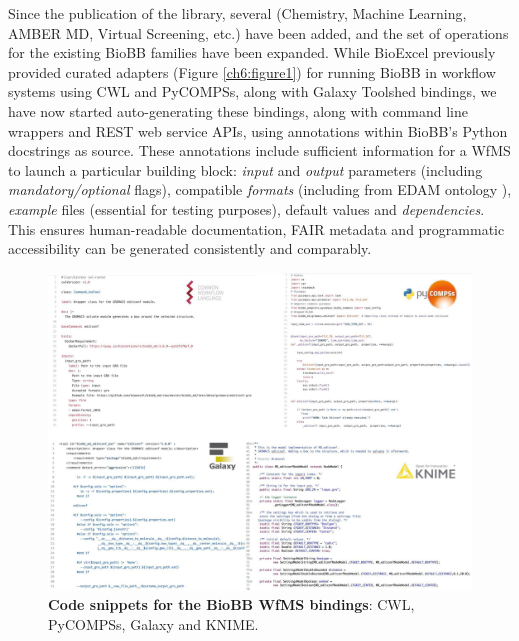 Since the publication of the library, several  (Chemistry, Machine Learning, AMBER MD, Virtual Screening, etc.) have been added, and the set of operations for the existing BioBB families have been expanded.
While BioExcel previously provided curated adapters (Figure \vref{ch6:figure1}) for running BioBB in workflow systems using 
\acrfull{CWL}
and PyCOMPSs, along with Galaxy Toolshed bindings, we have now started auto-generating these bindings, along with command line wrappers and REST web service APIs, using annotations within BioBB's Python docstrings as source.
These annotations include sufficient information for a \acrshort{WfMS} to launch a particular building block: \emph{input} and \emph{output} parameters (including \emph{mandatory/optional} flags), compatible \emph{formats} (including from EDAM ontology \cite{Ison 2013}), \emph{example} files (essential for testing purposes), default values and \emph{dependencies}.
This ensures human-readable documentation, FAIR metadata and programmatic accessibility can be generated consistently and comparably.

\begin{figure}%
  \includegraphics[width=\textwidth]{figures/ch06/figure1.jpg}
	\caption[Code snippets for the BioBB WfMS bindings]{
    \textbf{Code snippets for the BioBB WfMS bindings}: 
    CWL, PyCOMPSs, Galaxy and KNIME.}
  \label{ch6:figure1}
\end{figure}

